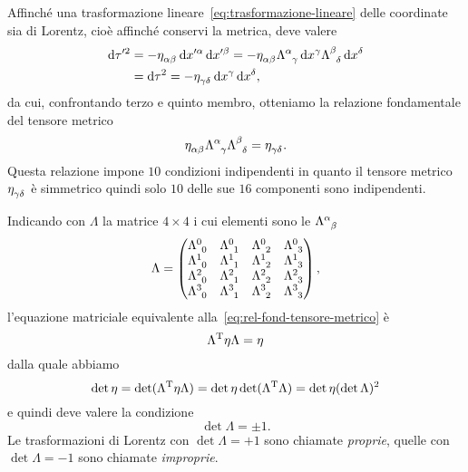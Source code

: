Affinché una trasformazione lineare~\eqref{eq:trasformazione-lineare} delle
coordinate sia di Lorentz, cioè affinché conservi la metrica, deve valere
\begin{equation}
  \begin{split}
    \dd \tau'^{2} &= -\tensor{\eta}{_{\alpha\beta}}\dd x'^{\alpha}\dd x'^{\beta}
    = -\tensor{\eta}{_{\alpha\beta}} \tensor{\Lambda}{^{\alpha}_{\gamma}} \dd
    x^{\gamma} \tensor{\Lambda}{^{\beta}_{\delta}} \dd x^{\delta} \\
    &= \dd \tau^{2} = -\tensor{\eta}{_{\gamma\delta}} \dd x^{\gamma} \dd x^{\delta},
  \end{split}
\end{equation}
da cui, confrontando terzo e quinto membro, otteniamo la relazione fondamentale
del tensore metrico
\begin{equation}
  \label{eq:rel-fond-tensore-metrico}
  \tensor{\eta}{_{\alpha\beta}} \tensor{\Lambda}{^{\alpha}_{\gamma}}
  \tensor{\Lambda}{^{\beta}_{\delta}} = \tensor{\eta}{_{\gamma\delta}}.
\end{equation}
Questa relazione impone $10$ condizioni indipendenti in quanto il tensore
metrico $\tensor{\eta}{_{\gamma\delta}}$ è simmetrico quindi solo $10$ delle sue
$16$ componenti sono indipendenti.

Indicando con $\Lambda$ la matrice $4 \times 4$ i cui elementi sono le
$\tensor{\Lambda}{^{\alpha}_{\beta}}$
\begin{equation}
  \Lambda =
  \begin{pmatrix}
    \tensor{\Lambda}{^{0}_{0}} & \tensor{\Lambda}{^{0}_{1}} &
    \tensor{\Lambda}{^{0}_{2}} & \tensor{\Lambda}{^{0}_{3}} \\
    \tensor{\Lambda}{^{1}_{0}} & \tensor{\Lambda}{^{1}_{1}} &
    \tensor{\Lambda}{^{1}_{2}} & \tensor{\Lambda}{^{1}_{3}} \\
    \tensor{\Lambda}{^{2}_{0}} & \tensor{\Lambda}{^{2}_{1}} &
    \tensor{\Lambda}{^{2}_{2}} & \tensor{\Lambda}{^{2}_{3}} \\
    \tensor{\Lambda}{^{3}_{0}} & \tensor{\Lambda}{^{3}_{1}} &
    \tensor{\Lambda}{^{3}_{2}} & \tensor{\Lambda}{^{3}_{3}}
  \end{pmatrix},
\end{equation}
l'equazione matriciale equivalente alla~\eqref{eq:rel-fond-tensore-metrico} è
\begin{equation}
  \Lambda^{\textup{T}}\eta\Lambda = \eta
\end{equation}
dalla quale abbiamo
\begin{equation}
  \det\eta = \det(\Lambda^{\textup{T}}\eta\Lambda) = \det\eta
  \det(\Lambda^{\textup{T}}\Lambda) = \det\eta (\det\Lambda)^{2}
\end{equation}
e quindi deve valere la condizione
\begin{equation}
  \det\Lambda = \pm 1.
\end{equation}
Le trasformazioni di Lorentz con $\det\Lambda = +1$ sono chiamate
\emph{proprie}, quelle con $\det\Lambda = -1$ sono chiamate \emph{improprie}.

